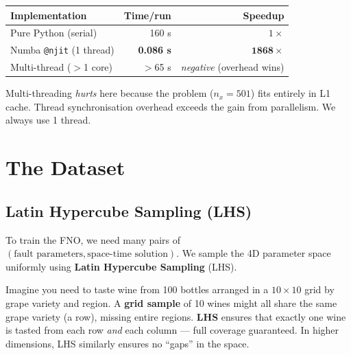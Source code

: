 \documentclass[12pt, a4paper]{article}
\theoremstyle{definition}
\begin{document}
\begin{tcolorbox}[highlight=mygreen, title=Key Result: Simulator Speedup]
  \begin{center}
  \begin{tabular}{lrr}
    \toprule
    Implementation & Time/run & Speedup \\
    \midrule
    Pure Python (serial) & 160 s & $1\times$ \\
    Numba \texttt{@njit} (1 thread) & \textbf{0.086 s} & $\mathbf{1868\times}$ \\
    Multi-thread ($>$1 core) & $>$65 s & \textit{negative} (overhead wins) \\
    \bottomrule
  \end{tabular}
  \end{center}
  \vspace{4pt}
  \small Multi-threading \textit{hurts} here because the problem ($n_x = 501$)
  fits entirely in L1 cache.  Thread synchronisation overhead exceeds the gain
  from parallelism.  We always use 1 thread.
\end{tcolorbox}

\section{The Dataset}
\label{sec:dataset}

\subsection{Latin Hypercube Sampling (LHS)}

To train the FNO, we need many pairs of
$(\text{fault parameters}, \text{space-time solution})$.  We sample the 4D
parameter space uniformly using \textbf{Latin Hypercube Sampling} (LHS).

\begin{tcolorbox}[highlight=myorange, title=Grid Sampling vs. LHS — An Analogy]
  Imagine you need to taste wine from 100 bottles arranged in a $10\times10$
  grid by grape variety and region.  A \textbf{grid sample} of 10 wines might
  all share the same grape variety (a row), missing entire regions.
  \textbf{LHS} ensures that exactly one wine is tasted from each row \textit{and}
  each column — full coverage guaranteed. In higher dimensions, LHS similarly
  ensures no ``gaps'' in the space.
\end{tcolorbox}
\end{document}
